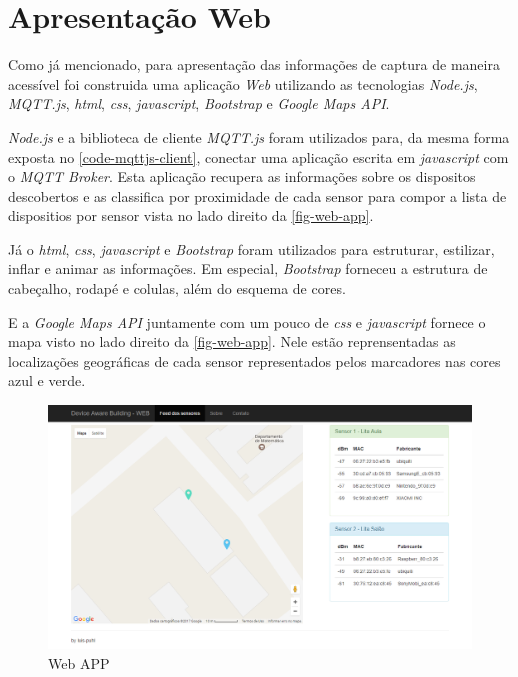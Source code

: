 \section{Apresentação Web}
\label{sec:app-web}

Como já mencionado, para apresentação das informações de captura de maneira
acessível foi construida uma aplicação \emph{Web} utilizando as tecnologias
\emph{Node.js}, \emph{MQTT.js}, \emph{html}, \emph{css}, \emph{javascript},
\emph{Bootstrap} e \emph{Google Maps API}.

\emph{Node.js} e a biblioteca de cliente \emph{MQTT.js} foram utilizados para,
da mesma forma exposta no \autoref{code-mqttjs-client}, conectar
uma aplicação escrita em \emph{javascript} com o \emph{MQTT Broker}. Esta
aplicação recupera as informações sobre os dispositos descobertos e as
classifica por proximidade de cada sensor para compor a lista de dispositios
por sensor vista no lado direito da \autoref{fig-web-app}.

Já o \emph{html}, \emph{css}, \emph{javascript} e \emph{Bootstrap} foram
utilizados para estruturar, estilizar, inflar e animar as informações. Em
especial, \emph{Bootstrap} forneceu a estrutura de cabeçalho, rodapé e colulas,
além do esquema de cores.

E a \emph{Google Maps API} juntamente com um pouco de \emph{css} e
\emph{javascript} fornece o mapa visto no lado direito da \autoref{fig-web-app}.
Nele estão reprensentadas as localizações geográficas de cada sensor
representados pelos marcadores nas cores azul e verde.

\begin{figure}[htb]
	\caption{\label{fig-web-app}Web APP}
	\begin{center}
		\includegraphics[width=1\textwidth]{053-web/web-app.png}
	\end{center}
\end{figure}
